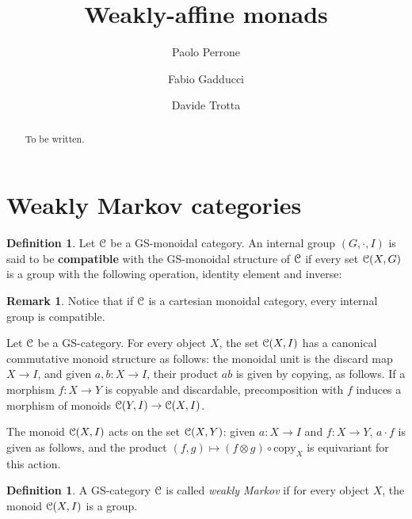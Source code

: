 \documentclass[a4paper,UKenglish,numberwithinsect,cleveref, autoref, thm-restate]{lipics-v2021}
\title{Weakly-affine monads}
\author{Paolo Perrone}{Department of Computer Science, University of Oxford}{paolo.perrone.math@gmail.com}{ }{}
\author{Fabio Gadducci}{Department of Computer Science, University of Pisa, Pisa, IT}{fabio.gadducci@unipi.it}{ https://orcid.org/
0000-0003-0690-3051}{}
\author{ Davide Trotta }{Department of Computer Science, University of Pisa, Pisa, IT}{trottadavide92@gmail.com}{https://orcid.org/0000-0003-4509-594X}{}
\theoremstyle{plain} %
\theoremstyle{definition} %
\newtheorem{mydefinition}[mytheorem]{Definition}
\newtheorem{myremark}[mytheorem]{Remark}
\begin{document}
\maketitle

\begin{abstract}
To be written.
\end{abstract}

\section{Weakly Markov categories}
\begin{mydefinition}
Let $\mathcal{C}$ be a GS-monoidal category. An internal group $(G,\cdot,I)$ is said to be \textbf{compatible} with the GS-monoidal structure of $\mathcal{C}$ if every set $\mathcal{C}(X,G)$ is a group with the following operation, identity element and inverse:
 
\end{mydefinition}
\begin{myremark}
Notice that if $\mathcal{C}$ is a cartesian monoidal category, every internal group is compatible.
\end{myremark}

Let $\mathcal{C}$ be a GS-category. For every object $X$, the set $\mathcal{C}(X,I)$ 
has a canonical commutative monoid structure as follows: the monoidal unit is the discard map $X\to I$, and given $a,b:X\to I$, their product $ab$ is given by copying, as follows.
If a morphism $f:X\to Y$ is copyable and discardable, precomposition with $f$ induces a morphism of monoids $\mathcal{C}(Y,I)\to\mathcal{C}(X,I)$. 

The monoid $\mathcal{C}(X,I)$ acts on the set $\mathcal{C}(X,Y)$: given $a:X\to I$ and $f:X\to Y$, $a\cdot f$ is given as follows,
and the product $(f,g)\mapsto (f\otimes g)\circ\mathrm{copy}_X$ is equivariant for this action. 

\begin{mydefinition}
 A GS-category $\mathcal{C}$ is called \emph{weakly Markov} if for every object $X$, the monoid $\mathcal{C}(X,I)$ is a group. 
\end{mydefinition}
\end{document}
